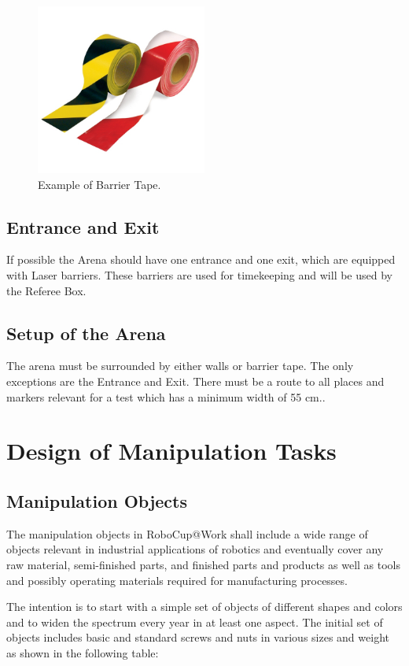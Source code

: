 \begin{figure}
\includegraphics[width= 0.5\textwidth ]{../images/example_barrier_tape.jpg}
\caption{Example of Barrier Tape.}
\label{fig:barrier_tape}
\end{figure}

\subsection{Entrance and Exit}
If possible the Arena should have one entrance and one exit, which are equipped with Laser barriers. These barriers are used for timekeeping and will be used by the Referee Box. 

\subsection{Setup of the Arena}
The arena must be surrounded by either walls or barrier tape. The only exceptions are the Entrance and Exit. There must be a route to all places and markers relevant for a test which has a minimum width of 55 cm..

\section{Design of Manipulation Tasks}

\subsection{Manipulation Objects}
The manipulation objects in RoboCup@Work shall include a wide range of objects relevant in industrial applications of robotics and eventually cover any raw material, semi-finished parts, and finished parts and products as well as tools and possibly operating materials required for manufacturing processes. 
\par
The intention is to start with a simple set of objects of different shapes and colors and to widen the spectrum every year in at least one aspect. The initial set of objects includes basic and standard screws and nuts in various sizes and weight as shown in the following table:




